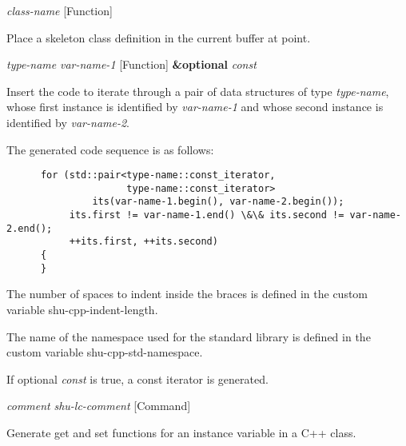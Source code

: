 \vspace{1em}
\noindent
{}
\usebox{\funcname}\emph{class-name}
 \hfill [Function]

\begin{doc-string}
Place a skeleton class definition in the current buffer at point.
\end{doc-string}

\vspace{1em}
\noindent
{}
\usebox{\funcname}\emph{type-name} \emph{var-name-1}
 \hfill [Function]
\hspace*{\wd\funcname}\textbf{\&optional} \emph{const}

\begin{doc-string}
Insert the code to iterate through a pair of data structures of type
\emph{type-name}, whose first instance is identified by \emph{var-name-1} and whose second
instance is identified by \emph{var-name-2}.

The generated code sequence is as follows:

\small{\begin{verbatim}
      for (std::pair<type-name::const_iterator,
                     type-name::const_iterator>
               its(var-name-1.begin(), var-name-2.begin());
           its.first != var-name-1.end() \&\& its.second != var-name-2.end();
           ++its.first, ++its.second)
      {
      }
\end{verbatim}}

The number of spaces to indent inside the braces is defined in the custom
variable shu-cpp-indent-length.

The name of the namespace used for the standard library is defined in the custom
variable shu-cpp-std-namespace.

If optional \emph{const} is true, a const iterator is generated.
\end{doc-string}

\vspace{1em}
\noindent
{}
\usebox{\funcname}\emph{comment} \emph{shu-lc-comment}
 \hfill [Command]

\begin{doc-string}
Generate get and set functions for an instance variable in a C++ class.
\end{doc-string}

